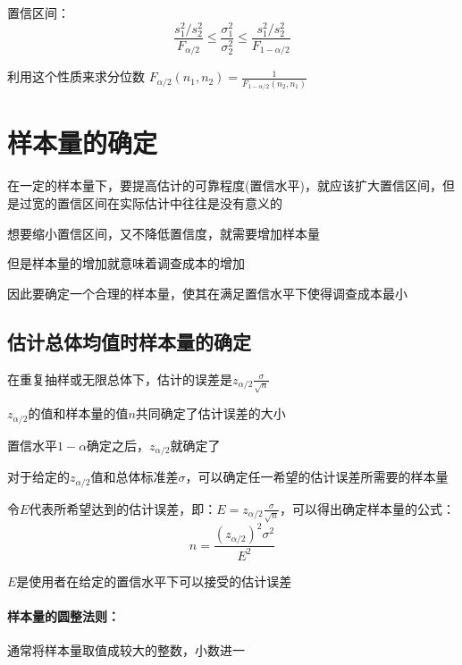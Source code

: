 \documentclass[UTF8,10pt]{book}
\begin{document}
                    {\kaishu 置信区间：}
                        $$   \frac{s_1^2/ s_2^2}{F_{\alpha/2}} \leq  \frac{\sigma_1^2}{\sigma_2^2}  \leq  \frac{s_1^2 / s_2^2}{F_{1-\alpha / 2}}  $$
                        

                    {\kaishu 利用这个性质来求分位数}  $  F_{\alpha/2} (n_1,n_2) =  \frac{1}{F_{1-\alpha/2} (n_2,n_1)} $ 

        
        
        \section{样本量的确定}
                {\kaishu 在一定的样本量下，要提高估计的可靠程度(置信水平)，就应该扩大置信区间，但是过宽的置信区间在实际估计中往往是没有意义的
                
                想要缩小置信区间，又不降低置信度，就需要增加样本量
                
                但是样本量的增加就意味着调查成本的增加
                
                因此要确定一个合理的样本量，使其在满足置信水平下使得调查成本最小}

            \subsection{估计总体均值时样本量的确定}

                {\kaishu 在重复抽样或无限总体下，估计的误差是$z_{\alpha/2}  \frac{\sigma}{\sqrt{n}}$
                
                $z_{\alpha/2}$的值和样本量的值$n$共同确定了估计误差的大小
                
                置信水平$1-\alpha$确定之后，$z_{\alpha/2}$就确定了
                
                对于给定的$z_{\alpha/2}$值和总体标准差$\sigma$，可以确定任一希望的估计误差所需要的样本量}

                令$E$代表所希望达到的估计误差，即：$E = z_{\alpha/2}  \frac{\sigma}{\sqrt{n}}$，可以得出确定样本量的公式：
                    $$ n =  \frac{(z_{\alpha/2})^2 \sigma^2}{E^2}$$

                $E$是使用者在给定的置信水平下可以接受的估计误差

                \paragraph{样本量的圆整法则：}通常将样本量取值成较大的整数，小数进一
\end{document}
